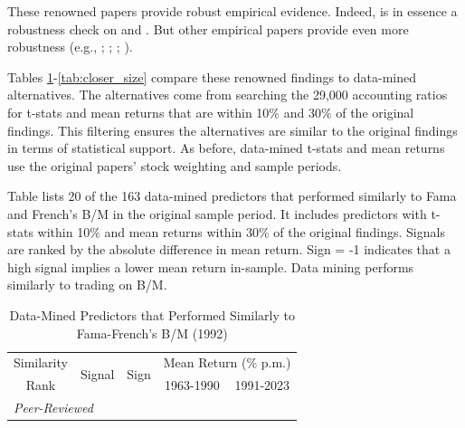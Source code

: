 These renowned papers provide robust empirical evidence. Indeed, \citet{fama1992cross} is in essence a robustness check on \citet{stattman1980book} and \citet{banz1981relationship}. But other empirical papers provide even more robustness (e.g., \citealt{fama1993common}; \citealt{lakonishok1994contrarian}; \citealt{chan1996momentum}; \citealt{asness2013value}). 

Tables \ref{tab:closer_bmdec}-\ref{tab:closer_size} compare these renowned findings to data-mined alternatives. The alternatives come from searching the 29,000 accounting ratios for t-stats and mean returns that are within 10\% and 30\% of the original findings. This filtering ensures the alternatives are similar to the original findings in terms of statistical support. As before,  data-mined t-stats and mean returns use the original papers' stock weighting and sample periods.

\begin{table}[p]
\caption{Data-Mined Predictors that Performed Similarly to Fama-French's B/M (1992)}
\label{tab:closer_bmdec}

\begin{singlespace}
\noindent Table lists 20 of the 163 data-mined predictors that performed similarly to Fama and French's \citeyearpar{fama1992cross} B/M in the original sample period. It includes predictors with t-stats within 10\% and mean returns within 30\% of the original findings. Signals are ranked by the absolute difference in mean return. Sign = -1 indicates that a high signal implies a lower mean return in-sample. Data mining performs similarly to trading on  B/M.
\end{singlespace}
\begin{centering}
\vspace{0ex}
\par\end{centering}
\centering{}\setlength{\tabcolsep}{0.7ex} \small
\begin{center}
\begin{tabular}{rlrrr} \toprule 
\multicolumn{1}{c}{Similarity} 
    & \multirow{2}[2]{*}{Signal} 
    & \multicolumn{1}{l}{\multirow{2}[2]{*}{Sign}} & \multicolumn{2}{c}{Mean Return (\% p.m.)} \\   
\multicolumn{1}{c}{Rank} 
    &   &   
    & \multicolumn{1}{c}{1963-1990} & \multicolumn{1}{c}{1991-2023} \\ \midrule \multicolumn{5}{l}{\textit{Peer-Reviewed}} \\ 
\midrule   

\bottomrule \end{tabular}%
\end{center} 
\end{table}

